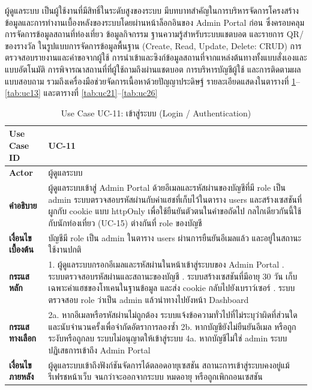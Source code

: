 ผู้ดูแลระบบ เป็นผู้ใช้งานที่มีสิทธิ์ในระดับสูงของระบบ มีบทบาทสำคัญในการบริหารจัดการโครงสร้างข้อมูลและการทำงานเบื้องหลังของระบบโดยผ่านหน้าล็อกอินของ Admin Portal ก่อน ซึ่งครอบคลุมการจัดการข้อมูลสถานที่ท่องเที่ยว ข้อมูลกิจกรรม ฐานความรู้สำหรับระบบแชตบอต และรายการ QR/ของรางวัล ในรูปแบบการจัดการข้อมูลพื้นฐาน (Create, Read, Update, Delete: CRUD) การตรวจสอบรายงานและคำขอจากผู้ใช้ การนำเข้าและซิงก์ข้อมูลสถานที่จากแหล่งต้นทางทั้งแบบสั่งเองและแบบอัตโนมัติ การพิจารณาสถานที่ที่ผู้ใช้ถามถึงผ่านแชตบอต การบริหารบัญชีผู้ใช้ และการติดตามผลแบบสอบถาม รวมถึงเครื่องมือช่วยจัดการเนื้อหาด้วยปัญญาประดิษฐ์ รายละเอียดแสดงในตารางที่ \ref{tab:uc11}--\ref{tab:uc13} และตารางที่ \ref{tab:uc21}--\ref{tab:uc26}

\nopagebreak
\begin{table}[H]
\centering
\caption{Use Case UC-11: เข้าสู่ระบบ (Login / Authentication)}
\label{tab:uc11}
\begin{tabular}{|p{3.2cm}|p{10cm}|}
\hline
\textbf{Use Case ID} & UC-11 \\ \hline
\textbf{Actor} & ผู้ดูแลระบบ \\ \hline
\textbf{คำอธิบาย} & ผู้ดูแลระบบเข้าสู่ Admin Portal ด้วยอีเมลและรหัสผ่านของบัญชีที่มี role เป็น admin ระบบตรวจสอบรหัสผ่านกับค่าแฮชที่เก็บไว้ในตาราง users และสร้างเซสชันที่ผูกกับ cookie แบบ httpOnly เพื่อใช้ยืนยันตัวตนในคำขอถัดไป กลไกเดียวกันนี้ใช้กับนักท่องเที่ยว (UC-15) ต่างกันที่ role ของบัญชี \\ \hline
\textbf{เงื่อนไขเบื้องต้น} & บัญชีมี role เป็น admin ในตาราง users ผ่านการยืนยันอีเมลแล้ว และอยู่ในสถานะใช้งานปกติ \\ \hline
\textbf{กระแสหลัก} & 1. ผู้ดูแลระบบกรอกอีเมลและรหัสผ่านในหน้าเข้าสู่ระบบของ Admin Portal \newline 2. ระบบตรวจสอบรหัสผ่านและสถานะของบัญชี \newline 3. ระบบสร้างเซสชันที่มีอายุ 30 วัน เก็บเฉพาะค่าแฮชของโทเคนในฐานข้อมูล และส่ง cookie กลับไปยังเบราว์เซอร์ \newline 4. ระบบตรวจสอบ role ว่าเป็น admin แล้วนำทางไปยังหน้า Dashboard \\ \hline
\textbf{กระแสทางเลือก} & 2a. หากอีเมลหรือรหัสผ่านไม่ถูกต้อง ระบบแจ้งข้อความทั่วไปที่ไม่ระบุว่าผิดที่ส่วนใด และนับจำนวนครั้งเพื่อจำกัดอัตราการลองซ้ำ \newline 2b. หากบัญชียังไม่ยืนยันอีเมล หรือถูกระงับหรือถูกลบ ระบบไม่อนุญาตให้เข้าสู่ระบบ \newline 4a. หากบัญชีไม่ใช่ admin ระบบปฏิเสธการเข้าถึง Admin Portal \\ \hline
\textbf{เงื่อนไขภายหลัง} & ผู้ดูแลระบบเข้าถึงฟังก์ชันจัดการได้ตลอดอายุเซสชัน สถานะการเข้าสู่ระบบคงอยู่แม้รีเฟรชหน้าเว็บ จนกว่าจะออกจากระบบ หมดอายุ หรือถูกเพิกถอนเซสชัน \\
\hline
\end{tabular}
\end{table}

